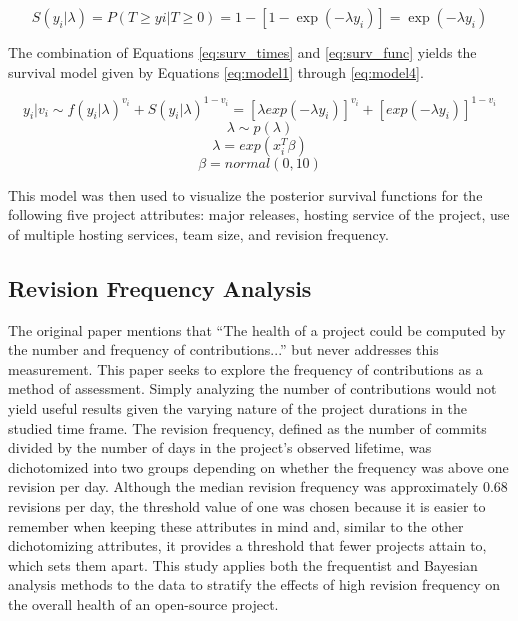 \documentclass[sigconf,review]{acmart}
\begin{document}
\begin{equation} \label{eq:surv_func}
    S(y_i|\lambda) = P(T \geq yi|T \geq 0) = 1 - [1 - \exp(-  \lambda y_i)] = \exp(- \lambda y_i)
\end{equation}

The combination of Equations \ref{eq:surv_times} and \ref{eq:surv_func} yields the survival model given by Equations \ref{eq:model1} through \ref{eq:model4}.

\begin{equation} \label{eq:model1}
    y_i|v_i \sim f(y_i| \lambda)^{v_i} + S(y_i| \lambda)^{1-v_i} = [\lambda exp(-  \lambda y_i)]^{v_i} + [exp(-  \lambda y_i)]^{1-v_i}
\end{equation}
\begin{equation} \label{eq:model2}
    \lambda \sim p(\lambda)
\end{equation}
\begin{equation} \label{eq:model3}
    \lambda = exp(x_i^T \beta)
\end{equation}
\begin{equation} \label{eq:model4}
    \beta = normal(0, 10)
\end{equation}

This model was then used to visualize the posterior survival functions for the following five project attributes: major releases, hosting service of the project, use of multiple hosting services, team size, and revision frequency. 

\subsection{Revision Frequency Analysis} \label{revisionFreq}

The original paper mentions that ``The health of a project could be computed by the number and frequency of contributions...'' \cite{ali2020cheating} but never addresses this measurement.
This paper seeks to explore the frequency of contributions as a method of assessment. 
Simply analyzing the number of contributions would not yield useful results given the varying nature of the project durations in the studied time frame. 
The revision frequency, defined as the number of commits divided by the number of days in the project's observed lifetime, was dichotomized into two groups depending on whether the frequency was above one revision per day.
Although the median revision frequency was approximately 0.68 revisions per day, the threshold value of one was chosen because it is easier to remember when keeping these attributes in mind and, similar to the other dichotomizing attributes, it provides a threshold that fewer projects attain to, which sets them apart.
This study applies both the frequentist and Bayesian analysis methods to the data to stratify the effects of high revision frequency on the overall health of an open-source project.
\end{document}
